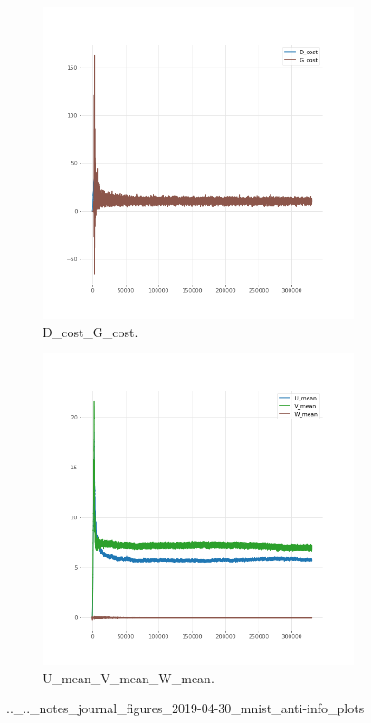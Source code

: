 \begin{figure}[!htbp]
   \centering
\begin{subfigure}[t]{0.48\textwidth}
   \includegraphics[width=\textwidth,center]{2019-04-30/mnist/anti-info/plots/D_cost_G_cost.png}
   \caption{D_cost_G_cost.}
   \label{fig:.._.._notes_journal_figures_2019-04-30_mnist_anti-info_plots-a}
\end{subfigure}
\begin{subfigure}[t]{0.48\textwidth}
   \includegraphics[width=\textwidth,center]{2019-04-30/mnist/anti-info/plots/U_mean_V_mean_W_mean.png}
   \caption{U_mean_V_mean_W_mean.}
   \label{fig:.._.._notes_journal_figures_2019-04-30_mnist_anti-info_plots-b}
\end{subfigure}
   \caption{.._.._notes_journal_figures_2019-04-30_mnist_anti-info_plots}
   \label{fig:2019-04-30_mnist_anti-info_plots}
\end{figure}
